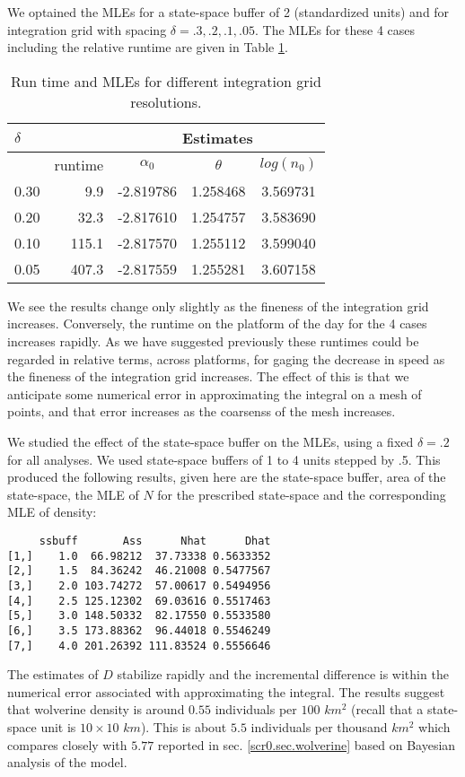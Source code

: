 We optained the MLEs for a state-space buffer of 2 (standardized
units) and for integration grid with spacing $\delta = .3, .2, .1,
.05$. The MLEs for these 4 cases including the relative runtime are
given in Table \ref{mle.tab.integration}.

\begin{table}[ht]
\centering
\caption{Run time and MLEs for different integration grid resolutions.}
\begin{tabular}{l|rccc}
\hline \hline
$\delta$ &   & \multicolumn{3}{c}{Estimates} \\ \hline
         &  runtime        & $\alpha_0$ & $\theta$ & $log(n_0)$ \\ \hline
 0.30   &  9.9  &  -2.819786 & 1.258468 & 3.569731  \\
 0.20   & 32.3  &  -2.817610 & 1.254757 & 3.583690 \\
 0.10  & 115.1  &  -2.817570 & 1.255112 & 3.599040 \\
 0.05 &  407.3 &   -2.817559&  1.255281&  3.607158 \\
\end{tabular}
\label{mle.tab.integration}
\end{table}


We see the results change only slightly as the fineness of the
integration grid increases. Conversely, the runtime on the platform of
the day for the 4 cases increases rapidly. 
As we have suggested previously these runtimes could be regarded in
relative terms,  across platforms, for gaging the decrease in
speed as the fineness of the integration grid increases. The effect of
this is that we anticipate some numerical error in approximating the
integral on a mesh of points, and that error increases as the
coarsenss of the mesh increases. 


We studied the effect of the state-space buffer on the MLEs,
using a fixed $\delta = .2$ for all analyses. We used state-space buffers
of 1 to 4 units stepped by .5. This produced the following results,
given here are the state-space buffer, area of the state-space, the
MLE of $N$ for the prescribed state-space and the corresponding MLE of
density:
{\small
\begin{verbatim}
     ssbuff       Ass      Nhat      Dhat
[1,]    1.0  66.98212  37.73338 0.5633352
[2,]    1.5  84.36242  46.21008 0.5477567
[3,]    2.0 103.74272  57.00617 0.5494956
[4,]    2.5 125.12302  69.03616 0.5517463
[5,]    3.0 148.50332  82.17550 0.5533580
[6,]    3.5 173.88362  96.44018 0.5546249
[7,]    4.0 201.26392 111.83524 0.5556646
\end{verbatim}
}
The estimates of $D$ stabilize rapidly and the incremental difference
is within the numerical error associated with approximating the
integral.  The results suggest that wolverine density is around $0.55$
individuals per $100$ $km^2$ (recall that a state-space unit is $10
\times 10$ $km$).  This is about $5.5$ individuals per thousand $km^2$
which compares closely with $5.77$ reported
in sec. \ref{scr0.sec.wolverine} based on Bayesian analysis of the
model.


